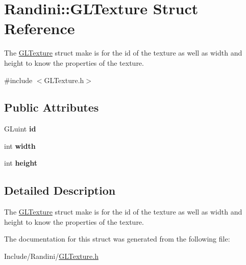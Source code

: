 \hypertarget{structRandini_1_1GLTexture}{
\section{Randini::GLTexture Struct Reference}
\label{structRandini_1_1GLTexture}
}


The \hyperlink{structRandini_1_1GLTexture}{GLTexture} struct make is for the id of the texture as well as width and height to know the properties of the texture.  


{\ttfamily \#include $<$GLTexture.h$>$}\subsection*{Public Attributes}
\begin{DoxyCompactItemize}
\item 
\hypertarget{structRandini_1_1GLTexture_a3117c23b15d40c3d74839389375c5555}{
GLuint {\bfseries id}}
\label{structRandini_1_1GLTexture_a3117c23b15d40c3d74839389375c5555}

\item 
\hypertarget{structRandini_1_1GLTexture_a6396e1a205d08bd964fafb1e36015424}{
int {\bfseries width}}
\label{structRandini_1_1GLTexture_a6396e1a205d08bd964fafb1e36015424}

\item 
\hypertarget{structRandini_1_1GLTexture_a201cce365bc9eec2b43a7b3b4522109c}{
int {\bfseries height}}
\label{structRandini_1_1GLTexture_a201cce365bc9eec2b43a7b3b4522109c}

\end{DoxyCompactItemize}


\subsection{Detailed Description}
The \hyperlink{structRandini_1_1GLTexture}{GLTexture} struct make is for the id of the texture as well as width and height to know the properties of the texture. 

The documentation for this struct was generated from the following file:\begin{DoxyCompactItemize}
\item 
Include/Randini/\hyperlink{GLTexture_8h}{GLTexture.h}\end{DoxyCompactItemize}
